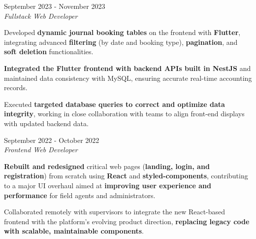 \documentclass[../main.tex]{subfiles}
\begin{document}
\vspace{0.4 cm}

\begin{twocolentry}{
		September 2023 - November 2023
	}
	 \\
	\vspace{0.10 cm}
	\textit{Fullstack Web Developer}
\end{twocolentry}
\vspace{0.10 cm}
\begin{onecolentry}
	\begin{highlights}
		\item Developed \textbf{dynamic journal booking tables} on the frontend with \textbf{Flutter}, integrating advanced \textbf{filtering} (by date and booking type), \textbf{pagination}, and \textbf{soft deletion} functionalities.
		\item \textbf{Integrated the Flutter frontend with backend APIs built in NestJS} and maintained data consistency with MySQL, ensuring accurate real-time accounting records.
		\item Executed \textbf{targeted database queries to correct and optimize data integrity}, working in close collaboration with teams to align front-end displays with updated backend data.
	\end{highlights}
\end{onecolentry}


\vspace{0.4 cm}

\begin{twocolentry}{
		September 2022 - October 2022
	}
	 \\
	\vspace{0.10 cm}
	\textit{Frontend Web Developer}
\end{twocolentry}
\vspace{0.10 cm}
\begin{onecolentry}
	\begin{highlights}
		\item \textbf{Rebuilt and redesigned} critical web pages (\textbf{landing, login, and registration}) from scratch using \textbf{React} and \textbf{styled-components}, contributing to a major UI overhaul aimed at \textbf{improving user experience and performance} for field agents and administrators.
		\item Collaborated remotely with supervisors to integrate the new React-based frontend with the platform’s evolving product direction, \textbf{replacing legacy code with scalable, maintainable components}.
	\end{highlights}
\end{onecolentry}
\end{document}
